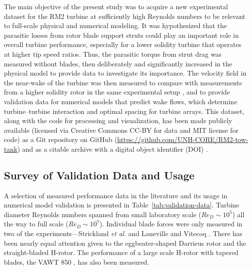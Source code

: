 The main objective of the present study was to acquire a new experimental
dataset for the RM2 turbine at sufficiently high Reynolds numbers to be relevant
to full-scale physical and numerical modeling. It was hypothesized that the
parasitic losses from rotor blade support struts could play an important role in
overall turbine performance, especially for a lower solidity turbine that
operates at higher tip speed ratios. Thus, the parasitic torque from strut drag
was measured without blades, then deliberately and significantly increased in
the physical model to provide data to investigate its importance. The velocity
field in the near-wake of the turbine was then measured to compare with
measurements from a higher solidity rotor in the same experimental setup
\cite{Bachant2015-JoT}, and to provide validation data for numerical models that
predict wake flows, which determine turbine--turbine interaction and optimal
spacing for turbine arrays. This dataset, along with the code for processing and
visualization, has been made publicly available (licensed via Creative Commons
CC-BY for data and MIT license for code) as a Git repository on GitHub
(\url{https://github.com/UNH-CORE/RM2-tow-tank}) and as a citable archive with a
digital object identifier (DOI) \cite{Bachant2016-RM2-data}.


\subsection{Survey of Validation Data and Usage}

A selection of measured performance data in the literature and its usage in
numerical model validation is presented in Table~\ref{tab:validation-data}.
Turbine diameter Reynolds numbers spanned from small laboratory scale ($Re_D
\sim 10^5$) all the way to full scale ($Re_D \sim 10^7$). Individual blade
forces were only measured in two of the experiments---Strickland \emph{et al.}
\cite{Strickland1981} and Laneville and Vitecoq \cite{Laneville1986}. There has
been nearly equal attention given to the eggbeater-shaped Darrieus rotor and the
straight-bladed H-rotor. The performance of a large scale H-rotor with tapered
blades, the VAWT 850 \cite{Mays1990}, has also been measured.

